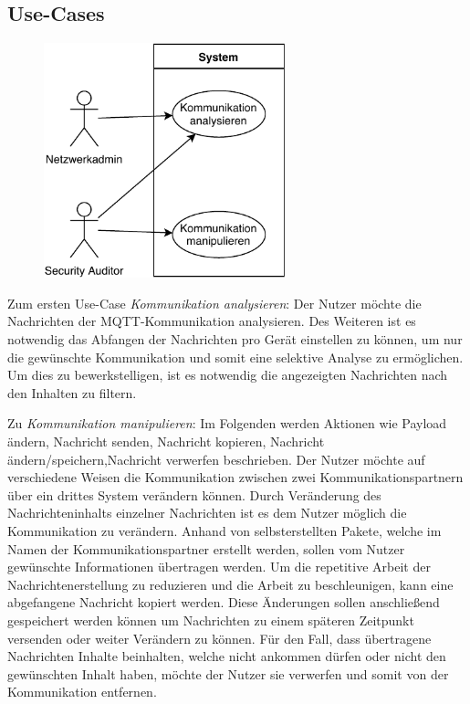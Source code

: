     \subsection{Use-Cases}
    \begin{figure}[h]%
        \centering
        \includegraphics[width=7cm]{tex/bilder/3_anforderungen/Use-Case.pdf}
        \label{fig:use-case}
    \end{figure}
    
    Zum ersten Use-Case \emph{Kommunikation analysieren}:
    	Der Nutzer möchte die Nachrichten der \ac{MQTT}-Kommunikation analysieren.
    	Des Weiteren ist es notwendig das Abfangen der Nachrichten pro Gerät einstellen zu können, um nur die gewünschte Kommunikation und somit eine selektive Analyse zu ermöglichen.
    	Um dies zu bewerkstelligen, ist es notwendig die angezeigten Nachrichten nach den Inhalten zu filtern.
    	
    Zu \emph{Kommunikation manipulieren}:
        Im Folgenden werden Aktionen wie Payload ändern, Nachricht senden, Nachricht kopieren, Nachricht ändern/speichern,Nachricht verwerfen beschrieben.
    	Der Nutzer möchte auf verschiedene Weisen die Kommunikation zwischen zwei Kommunikationspartnern über ein drittes System verändern können.
    	Durch Veränderung des Nachrichteninhalts einzelner Nachrichten ist es dem Nutzer möglich die Kommunikation zu verändern.
    	Anhand von selbsterstellten Pakete, welche im Namen der Kommunikationspartner erstellt werden, sollen vom Nutzer gewünschte Informationen übertragen werden.
    	Um die repetitive Arbeit der Nachrichtenerstellung zu reduzieren und die Arbeit zu beschleunigen, kann eine abgefangene Nachricht kopiert werden.
    	Diese Änderungen sollen anschließend gespeichert werden können um Nachrichten zu einem späteren Zeitpunkt versenden oder weiter Verändern zu können.
    	Für den Fall, dass übertragene Nachrichten Inhalte beinhalten, welche nicht ankommen dürfen oder nicht den gewünschten Inhalt haben, möchte der Nutzer sie verwerfen und somit von der Kommunikation entfernen.

